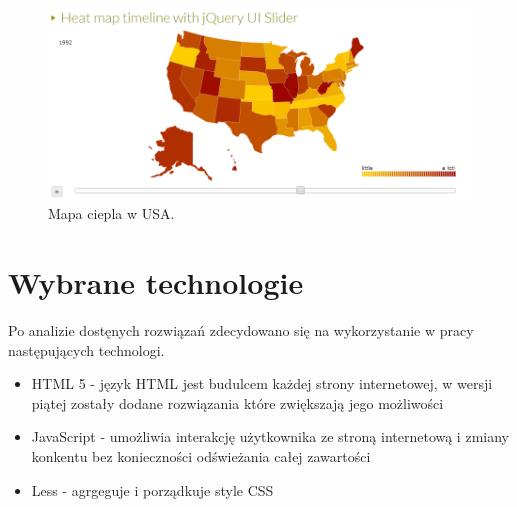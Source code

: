 \begin{figure}[H]
  \centering
    \includegraphics[width=130mm]{ge/jsheatmap.png}
  \caption{Mapa ciepla w USA.}
  \label{fig:jsheatmap}
\end{figure}

\section{Wybrane technologie}
\label{sec:technologie}

Po analizie dostęnych rozwiązań zdecydowano się na wykorzystanie w pracy następujących technologi.
\begin{itemize}

\item
HTML 5 - język HTML jest budulcem każdej strony internetowej, w wersji piątej zostały dodane rozwiązania które zwiększają jego możliwości

\item
JavaScript - umożliwia interakcję użytkownika ze stroną internetową  i zmiany konkentu bez konieczności odświeżania całej zawartości

\item
Less - agrgeguje i porządkuje style CSS

\end{itemize}
